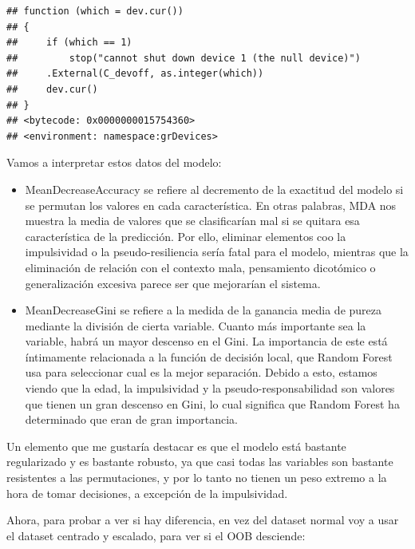 \documentclass[]{article}
\newenvironment{Shaded}{\begin{snugshade}}{\end{snugshade}}
\newcommand{\KeywordTok}[1]{\textcolor[rgb]{0.13,0.29,0.53}{\textbf{#1}}}
\newcommand{\DecValTok}[1]{\textcolor[rgb]{0.00,0.00,0.81}{#1}}
\newcommand{\StringTok}[1]{\textcolor[rgb]{0.31,0.60,0.02}{#1}}
\newcommand{\CommentTok}[1]{\textcolor[rgb]{0.56,0.35,0.01}{\textit{#1}}}
\newcommand{\OperatorTok}[1]{\textcolor[rgb]{0.81,0.36,0.00}{\textbf{#1}}}
\newcommand{\NormalTok}[1]{#1}
\begin{document}
\begin{verbatim}
## function (which = dev.cur()) 
## {
##     if (which == 1) 
##         stop("cannot shut down device 1 (the null device)")
##     .External(C_devoff, as.integer(which))
##     dev.cur()
## }
## <bytecode: 0x0000000015754360>
## <environment: namespace:grDevices>
\end{verbatim}

Vamos a interpretar estos datos del modelo:

\begin{itemize}
\item
  MeanDecreaseAccuracy se refiere al decremento de la exactitud del
  modelo si se permutan los valores en cada característica. En otras
  palabras, MDA nos muestra la media de valores que se clasificarían mal
  si se quitara esa característica de la predicción. Por ello, eliminar
  elementos coo la impulsividad o la pseudo-resiliencia sería fatal para
  el modelo, mientras que la eliminación de relación con el contexto
  mala, pensamiento dicotómico o generalización excesiva parece ser que
  mejorarían el sistema.
\item
  MeanDecreaseGini se refiere a la medida de la ganancia media de pureza
  mediante la división de cierta variable. Cuanto más importante sea la
  variable, habrá un mayor descenso en el Gini. La importancia de este
  está íntimamente relacionada a la función de decisión local, que
  Random Forest usa para seleccionar cual es la mejor separación. Debido
  a esto, estamos viendo que la edad, la impulsividad y la
  pseudo-responsabilidad son valores que tienen un gran descenso en
  Gini, lo cual significa que Random Forest ha determinado que eran de
  gran importancia.
\end{itemize}

Un elemento que me gustaría destacar es que el modelo está bastante
regularizado y es bastante robusto, ya que casi todas las variables son
bastante resistentes a las permutaciones, y por lo tanto no tienen un
peso extremo a la hora de tomar decisiones, a excepción de la
impulsividad.

Ahora, para probar a ver si hay diferencia, en vez del dataset normal
voy a usar el dataset centrado y escalado, para ver si el OOB desciende:

\begin{Shaded}
\end{Shaded}
\end{document}

